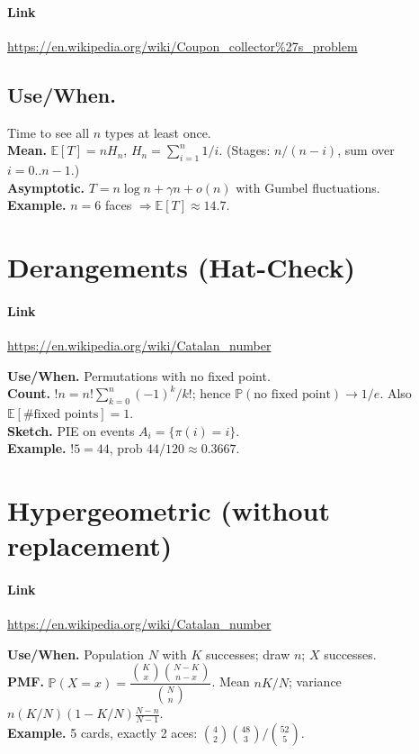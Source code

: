 \documentclass[11pt,A4,twoside]{article}
\let\oldsection\section
\renewcommand{\section}{\FloatBarrier\oldsection}
\let\oldsubsection\subsection
\renewcommand{\subsection}{\FloatBarrier\oldsubsection}
\numberwithin{equation}{section}
\newcommand{\E}{\mathbb{E}}
\theoremstyle{definition}
\theoremstyle{remark}
\newcommand{\Prob}{\mathbb{P}}
\newcommand{\Binom}[2]{\binom{#1}{#2}}
\begin{document}
\paragraph{Link} \url{https://en.wikipedia.org/wiki/Coupon_collector%27s_problem}

\subsection{Use/When.} Time to see all \(n\) types at least once.\\
\textbf{Mean.} \(\E[T]=nH_n\), \(H_n=\sum_{i=1}^n 1/i\). (Stages: \(n/(n-i)\), sum over \(i=0..n-1\).)\\
\textbf{Asymptotic.} \(T=n\log n + \gamma n + o(n)\) with Gumbel fluctuations.\\
\textbf{Example.} \(n=6\) faces \(\Rightarrow \E[T]\approx 14.7\).

\section{Derangements (Hat-Check)}
\paragraph{Link} \url{https://en.wikipedia.org/wiki/Catalan_number}

\textbf{Use/When.} Permutations with no fixed point.\\
\textbf{Count.} \(!n=n!\sum_{k=0}^n (-1)^k/k!\); hence \(\Prob(\text{no fixed point})\to 1/e\). Also \(\E[\#\text{fixed points}]=1\).\\
\textbf{Sketch.} PIE on events \(A_i=\{\pi(i)=i\}\).\\
\textbf{Example.} \(!5=44\), prob \(44/120\approx 0.3667\).

\section{Hypergeometric (without replacement)}
\paragraph{Link} \url{https://en.wikipedia.org/wiki/Catalan_number}

\textbf{Use/When.} Population \(N\) with \(K\) successes; draw \(n\); \(X\) successes.\\
\textbf{PMF.} \(\Prob(X=x)=\dfrac{\Binom{K}{x}\Binom{N-K}{n-x}}{\Binom{N}{n}}\). Mean \(nK/N\); variance \(n(K/N)(1-K/N)\frac{N-n}{N-1}\).\\
\textbf{Example.} 5 cards, exactly 2 aces: \(\Binom{4}{2}\Binom{48}{3}/\Binom{52}{5}\).
\end{document}
